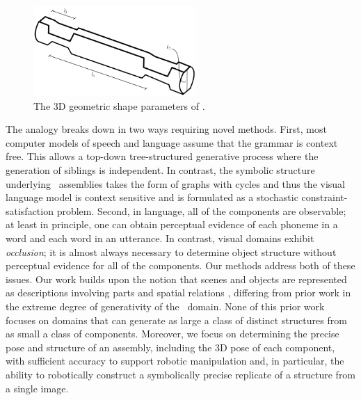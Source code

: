 \begin{figure}
  \vspace*{-5ex}
  \centering
  \includegraphics[width=0.55\textwidth]{images/log-parameters.png}
  \vspace*{-7ex}
  \caption{\small The 3D geometric shape parameters of \LincolnLogs.}
  \label{fig-ll1:logs}
\end{figure}
%
The analogy breaks down in two ways requiring novel methods.
%
First, most computer models of speech and language assume that the grammar is
context free.
%
This allows a top-down tree-structured generative process where the
generation of siblings is independent.
%
In contrast, the symbolic structure underlying \LincolnLog\ assemblies takes
the form of graphs with cycles and thus the visual language model is
context sensitive and is formulated as a stochastic constraint-satisfaction
problem.
%
Second, in language, all of the components are observable; at least in
principle, one can obtain perceptual evidence of each phoneme in a word and
each word in an utterance.
%
In contrast, visual domains exhibit \emph{occlusion}; it is almost always
necessary to determine object structure without perceptual evidence for all of
the components.
%
Our methods address both of these issues.
%
Our work builds upon the notion that scenes and objects are represented as
descriptions involving parts and spatial relations
\cite{Marr1978,Biederman1987,Wang2006,Zhu2006,Siskind2007,Zhu2007,Heitz2008,Lippow2008,Savova2008,
  Savova2009}, differing from prior work in the extreme degree of generativity
of the \LincolnLog\ domain.
%
None of this prior work focuses on domains that can generate as large a class
of distinct structures from as small a class of components.
%
Moreover, we focus on determining the precise pose and structure of an
assembly, including the 3D pose of each component, with sufficient accuracy to
support robotic manipulation and, in particular, the ability to robotically
construct a symbolically precise replicate of a structure from a single image.


